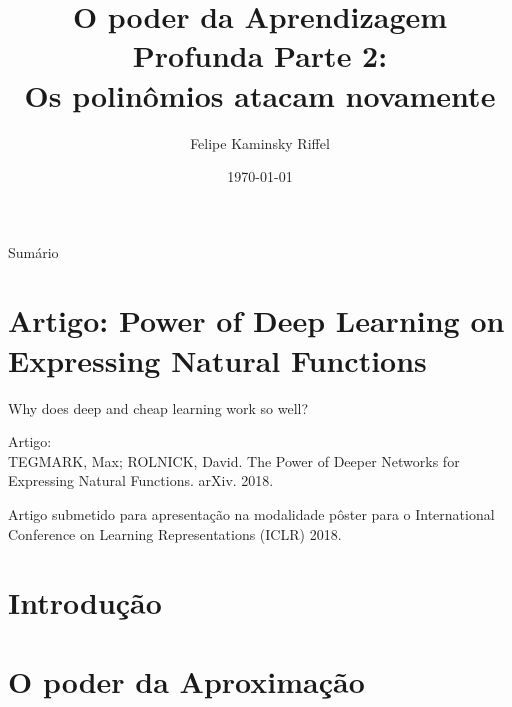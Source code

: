 \documentclass{beamer}
\title{O poder da Aprendizagem Profunda Parte 2: \\
Os polinômios atacam novamente}
\author{Felipe Kaminsky Riffel}
\date{\today}
\institute{Universidade Federal de Santa Catarina}
\theoremstyle{definition}
\begin{document}
{ 
\frame{\titlepage}}

\begin{frame}{Sumário}
    \tableofcontents
\end{frame}
  

\section{Artigo: Power of Deep Learning on Expressing Natural Functions}    
\begin{frame}
\tableofcontents[currentsection]
\end{frame}

\begin{frame}{Why does deep and cheap learning work so well?}

    Artigo: \\
    
    TEGMARK, Max; ROLNICK, David. The Power of Deeper Networks for Expressing Natural Functions. arXiv. 2018. \cite{rolnick2018}

    \vspace{1em}
    Artigo submetido para apresentação na modalidade pôster para o International Conference on Learning Representations (ICLR) 2018.

\end{frame}

\section{Introdução}

\section{O poder da Aproximação}
\begin{frame}
    \tableofcontents[currentsection]
\end{frame}
\end{document}
